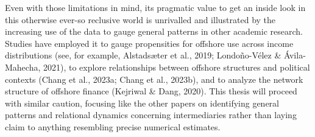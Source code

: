 Even with those limitations in mind, its pragmatic value to get an inside look in this otherwise ever-so reclusive world is unrivalled and illustrated by the increasing use of the data to gauge general patterns in other academic research. Studies have employed it to gauge propensities for offshore use across income distributions (see, for example, Alstadsæter et al., 2019; Londoño-Vélez \& Ávila-Mahecha, 2021), to explore relationships between offshore structures and political contexts (Chang et al., 2023a; Chang et al., 2023b), and to analyze the network structure of offshore finance (Kejriwal \& Dang, 2020). This thesis will proceed with similar caution, focusing like the other papers on identifying general patterns and relational dynamics concerning intermediaries rather than laying claim to anything resembling precise numerical estimates.



